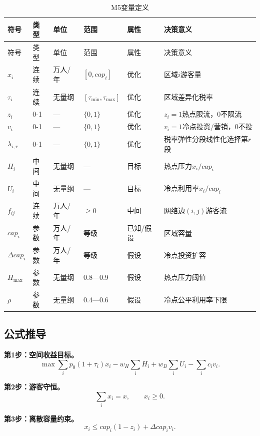 \documentclass[UTF8,a4paper,12pt]{ctexart}
\begin{document}
\begin{longtable}{@{}p{1.5cm}p{1.3cm}p{1.2cm}p{2.2cm}p{1.2cm}p{5.1cm}@{}}
\caption{M5变量定义}\\
\toprule
符号 & 类型 & 单位 & 范围 & 属性 & 决策意义\\
\midrule
\endfirsthead
\toprule
符号 & 类型 & 单位 & 范围 & 属性 & 决策意义\\
\midrule
\endhead
\(x_i\) & 连续 & 万人/年 & \([0,cap_i]\) & 优化 & 区域\(i\)游客量\\
\(\tau_i\) & 连续 & 无量纲 & \([\tau_{\min},\tau_{\max}]\) & 优化 & 区域差异化税率\\
\(z_i\) & 0-1 & — & \(\{0,1\}\) & 优化 & \(z_i=1\)热点限流，0不限流\\
\(v_i\) & 0-1 & — & \(\{0,1\}\) & 优化 & \(v_i=1\)冷点投资/营销，0不投\\
\(\lambda_{i,r}\) & 0-1 & — & \(\{0,1\}\) & 优化 & 税率弹性分段线性化选择第\(r\)段\\
\(H_i\) & 中间 & 无量纲 & — & 目标 & 热点压力\(x_i/cap_i\)\\
\(U_i\) & 中间 & 无量纲 & — & 目标 & 冷点利用率\(x_i/cap_i\)\\
\(f_{ij}\) & 连续 & 万人/年 & \(\ge0\) & 中间 & 网络边\((i,j)\)游客流\\
\(cap_i\) & 参数 & 万人/年 & 等级 & 已知/假设 & 区域容量\\
\(\Delta cap_i\) & 参数 & 万人/年 & 等级 & 假设 & 冷点投资扩容\\
\(H_{\max}\) & 参数 & 无量纲 & 0.8—0.9 & 假设 & 热点压力阈值\\
\(\rho\) & 参数 & 无量纲 & 0.4—0.6 & 假设 & 冷点公平利用率下限\\
\bottomrule
\end{longtable}

\subsection{公式推导}

\textbf{第1步：空间收益目标。}
\begin{equation}\tag{M5-1}
\max \sum_i p_0(1+\tau_i)x_i -w_H\sum_i H_i +w_B\sum_i U_i -\sum_i c_i v_i.
\end{equation}

\textbf{第2步：游客守恒。}
\begin{equation}\tag{M5-2}
\sum_i x_i=x,\qquad x_i\ge0.
\end{equation}

\textbf{第3步：离散容量约束。}
\begin{equation}\tag{M5-3}
x_i\le cap_i(1-z_i)+\Delta cap_i v_i.
\end{equation}
\end{document}
